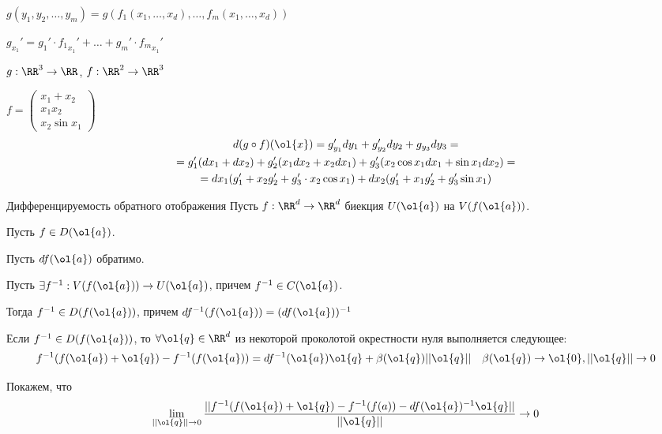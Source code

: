 \begin{example}{}{}
    \( g(y_1, y_2, \ldots, y_m) = g(f_1(x_1, \ldots, x_d), \ldots, f_m(x_1, \ldots, x_d)) \)

    \( g_{x_1}' = g_1' \cdot {f_1}_{x_1}' + \ldots + g_m' \cdot {f_m}_{x_1}' \)

    \( g : \RR^3 \to \RR \), \( f : \RR^2 \to \RR^3 \)

    \(
        f = \begin{pmatrix}
            x_1 + x_2
            \\
            x_1 x_2
            \\
            x_2 \sin x_1
        \end{pmatrix}
    \)
    \begin{gather*}
        d (g \circ f) (\ol{x})
        =
        g_{y_1}' dy_1 + g_{y_2}' dy_2 + g_{y_3} dy_3
        =
        \\
        =
        g_1' (dx_1 + dx_2) + g_2' (x_1 dx_2 + x_2 dx_1) + g_3' (x_2 \cos x_1 dx_1 + \sin x_1 dx_2)
        =
        \\
        =
        dx_1 (g_1' + x_2 g_2' + g_3' \cdot x_2 \cos x_1) + dx_2 (g_1' + x_1 g_2' + g_3' \sin x_1)
    \end{gather*}
\end{example}

\begin{thrm}{Дифференцируемость обратного отображения}{}
    Пусть \( f : \RR^d \to \RR^d \) биекция \( U(\ol{a}) \) на \( V(f(\ol{a})) \).

    Пусть \( f \in D(\ol{a}) \).

    Пусть \( df(\ol{a}) \) обратимо.

    Пусть \( \exists f^{-1} : V(f(\ol{a})) \to U(\ol{a}) \), причем \( f^{-1} \in C(\ol{a}) \).

    Тогда \( f^{-1} \in D(f(\ol{a})) \), причем \( df^{-1} (f(\ol{a})) = (df(\ol{a}))^{-1} \)
\end{thrm}

Если \( f^{-1} \in D(f(\ol{a})) \), то \( \forall \ol{q} \in \RR^d \) из некоторой проколотой окрестности нуля
выполняется следующее:
\[
    f^{-1} (f(\ol{a}) + \ol{q}) - f^{-1} (f(\ol{a})) = df^{-1} (\ol{a}) \ol{q} + \beta (\ol{q}) || \ol{q} ||
    \quad
    \beta(\ol{q}) \to \ol{0}, || \ol{q} || \to 0
\]

Покажем, что
\[
    \lim\limits_{|| \ol{q} || \to 0} \frac{|| f^{-1} (f(\ol{a}) + \ol{q}) - f^{-1} (f(a)) - df(\ol{a})^{-1} \ol{q} ||}{|| \ol{q} ||} \to 0
\]

